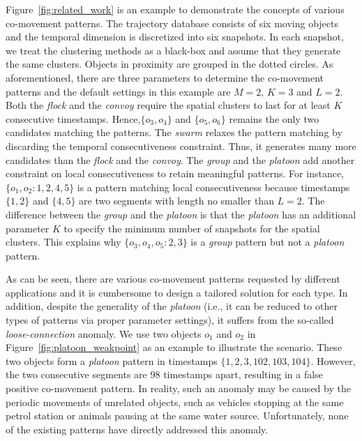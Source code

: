 Figure~\ref{fig:related_work} is an example to demonstrate the concepts of various co-movement patterns. The trajectory database consists of six moving objects and the temporal dimension is discretized into six snapshots. In each snapshot, we treat the clustering methods as a black-box and assume that they generate the same clusters. Objects in proximity are grouped in the dotted circles. As aforementioned, there are three parameters to determine the co-movement patterns and the default settings in this example are $M=2$, $K=3$ and $L=2$. Both the \emph{flock} and the \emph{convoy} require the spatial clusters to last for at least $K$ consecutive  timestamps. Hence,$\{o_3,o_4\}$ and $\{o_5,o_6\}$  remains the only two candidates matching the patterns. The \textit{swarm} relaxes the pattern matching by discarding the temporal consecutiveness constraint. Thus, it generates many more candidates than the \textit{flock} and the \textit{convoy}. The \textit{group} and the \textit{platoon} add another constraint on local consecutiveness to retain meaningful patterns. For instance, $\{o_1,o_2:1,2,4,5\}$ is a pattern matching local consecutiveness because timestamps $\{1,2\}$ and $\{4,5\}$ are two segments with length no smaller than $L=2$. The difference between the \textit{group} and the \textit{platoon} is that the \textit{platoon} has an additional parameter $K$ to specify the minimum number of snapshots for the spatial clusters. This explains why $\{o_3,o_4,o_5:2,3\}$ is a  \textit{group} pattern but not a \textit{platoon} pattern.

As can be seen, there are various co-movement patterns requested by different applications and it is cumbersome to design a tailored solution for each type. In addition, despite the generality of the \emph{platoon} (i.e., it can be reduced to other types of patterns via proper parameter settings), it suffers from the so-called \emph{loose-connection} anomaly. We use two objects $o_1$ and $o_2$ in Figure~\ref{fig:platoon_weakpoint} as an example to illustrate the scenario. These two objects form a \emph{platoon} pattern in timestamps $\{1,2,3,102,103,104\}$. However, the two consecutive segments are $98$ timestamps apart, resulting in a false positive co-movement pattern. In reality, such an anomaly may be caused  by the periodic movements of unrelated objects, such as vehicles stopping at the same petrol station or animals pausing at the same water source. 
Unfortunately, none of the existing patterns have directly addressed this anomaly.


